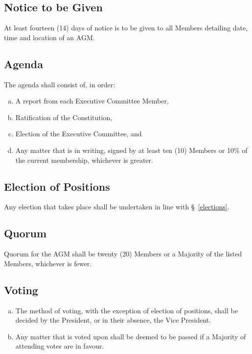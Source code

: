 \documentclass[a4paper,12pt]{article}
\begin{document}
\subsection{Notice to be Given}

At least fourteen (14) days of notice is to be given to all Members detailing date, time and location of an AGM.

\subsection{Agenda}

The agenda shall consist of, in order:

\begin{enumerate}[a)]
	\item A report from each Executive Committee Member,
	\item Ratification of the Constitution,
	\item Election of the Executive Committee, and
	\item Any matter that is in writing, signed by at least ten (10) Members or 10\% of the current membership, whichever is greater.
\end{enumerate}

\subsection{Election of Positions}

Any election that takes place shall be undertaken in line with \S~\ref{elections}.

\subsection{Quorum}

Quorum for the AGM shall be twenty (20) Members or a Majority of the listed Members, whichever is fewer.

\subsection{Voting}

\begin{enumerate}[a)]
	\item The method of voting, with the exception of election of positions, shall be decided by the President, or in their absence, the Vice President.
	\item Any matter that is voted upon shall be deemed to be passed if a Majority of attending votes are in favour.
\end{enumerate}
\end{document}

